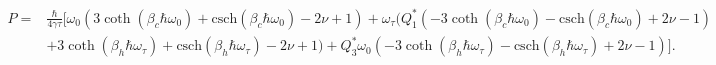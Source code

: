 \documentclass[preprints,article,accept,moreauthors,pdftex]{Definitions/mdpi}
\begin{document}
\begin{paracol}{2}
\vspace{-12pt}
\begin{adjustwidth}{-4.6cm}{0cm}
\begin{equation}
	\begin{split}
	P = & \frac{\hbar}{4 \gamma  \tau }  \big[\omega _0 \left(3 \coth \left(\beta_c \hbar \omega_0 \right)+\text{csch}\left(\beta_c \hbar \omega_0\right)-2 \nu +1\right)+\omega _{\tau } (Q^*_1 \left(-3 \coth\left(\beta_c \hbar \omega_0\right)-\text{csch}\left(\beta_c \hbar \omega_0\right)+2 \nu -1\right)
	\\ &+3 \coth \left(\beta_h \hbar \omega_{\tau} \right)+\text{csch}\left(\beta_h \hbar \omega_{\tau} \right)-2 \nu+1)+Q^*_3 \omega _0 \left(-3 \coth \left(\beta_h \hbar \omega_{\tau} \right)-\text{csch}\left(\beta_h \hbar \omega_{\tau} \right)+2 \nu-1\right)\big].
	\end{split}
\end{equation}
\end{adjustwidth}

 \vspace{-12pt}

\end{paracol}


\end{document}
